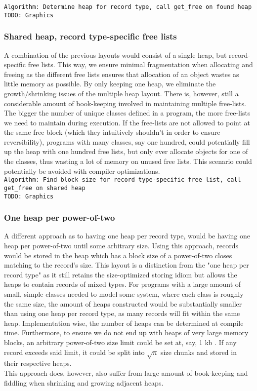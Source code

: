 \texttt{Algorithm: Determine heap for record type, call get\_free on found heap}\\

\texttt{TODO: Graphics}

\subsubsection{Shared heap, record type-specific free lists}
A combination of the previous layouts would consist of a single heap, but record-specific free lists. This way, we ensure minimal fragmentation when allocating and freeing as the different free lists ensures that allocation of an object wastes as little memory as possible. By only keeping one heap, we eliminate the growth/shrinking issues of the multiple heap layout. There is, however, still a considerable amount of book-keeping involved in maintaining multiple free-lists. The bigger the number of unique classes defined in a program, the more free-lists we need to maintain during execution. If the free-lists are not allowed to point at the same free block (which they intuitively shouldn't in order to ensure reversibility), programs with many classes, say one hundred, could potentially fill up the heap with one hundred free lists, but only ever allocate objects for one of the classes, thus wasting a lot of memory on unused free lists. This scenario could potentially be avoided with compiler optimizations.\\

\texttt{Algorithm: Find block size for record type-specific free list, call get\_free on shared heap}\\

\texttt{TODO: Graphics}

\subsubsection{One heap per power-of-two}
A different approach as to having one heap per record type, would be having one heap per power-of-two until some arbitrary size. Using this approach, records would be stored in the heap which has a block size of a power-of-two closes matching to the record's size. This layout is a distinction from the "one heap per record type" as it still retains the size-optimized storing idiom but allows the heaps to contain records of mixed types. For programs with a large amount of small, simple classes needed to model some system, where each class is roughly the same size, the amount of heaps constructed would be substantially smaller than using one heap per record type, as many records will fit within the same heap. Implementation wise, the number of heaps can be determined at compile time. Furthermore, to ensure we do not end up with heaps of very large memory blocks, an arbitrary power-of-two size limit could be set at, say, 1 kb . If any record exceeds said limit, it could be split into $\sqrt{n}$ size chunks and stored in their respective heaps.\\
This approach does, however, also suffer from large amount of book-keeping and fiddling when shrinking and growing adjacent heaps.\\

